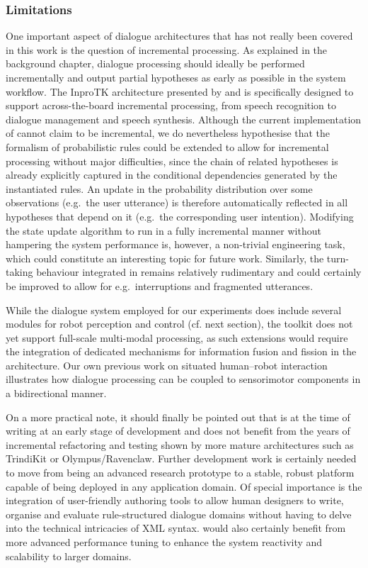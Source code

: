 \subsubsection*{Limitations}

One important aspect of dialogue architectures that has not really been covered in this work is the question of incremental processing.  As explained in the background chapter, dialogue processing should ideally be performed incrementally and output partial hypotheses as early as possible in the system workflow. The InproTK architecture presented by \cite{Baumann:2012} and \cite{baumann2013:phd} is specifically designed to support across-the-board incremental processing, from speech recognition to dialogue management and speech synthesis. Although the current implementation of \opendial{} cannot claim to be incremental, we do nevertheless hypothesise that the formalism of probabilistic rules could be extended to allow for incremental processing without major difficulties, since the chain of related hypotheses is already explicitly captured in the conditional dependencies generated by the instantiated rules.  An update in the probability distribution over some observations (e.g.\ the user utterance) is therefore automatically reflected in all hypotheses that depend on it (e.g.\ the corresponding user intention). Modifying the state update algorithm to run in a fully incremental manner without hampering the system performance is, however, a non-trivial engineering task, which could constitute an interesting topic for future work. Similarly, the turn-taking behaviour integrated in \opendial{} remains relatively rudimentary and could certainly be improved to allow for e.g.\ interruptions and fragmented utterances.

While the dialogue system employed for our experiments does include several modules for robot perception and control (cf. next section), the toolkit does not yet support full-scale multi-modal processing, as such extensions would require the integration of dedicated mechanisms for information fusion and fission in the architecture. Our own previous work on situated human--robot interaction \citep{cosybook:dialogue} illustrates how dialogue processing can be coupled to sensorimotor components in a bidirectional manner.  

On a more practical note, it should finally be pointed out that \opendial{} is at the time of writing at an early stage of development and does not benefit from the years of incremental refactoring and testing shown by more mature architectures such as TrindiKit or Olympus/Ravenclaw. Further development work is certainly needed to move \opendial{} from being an advanced research prototype to a stable, robust platform capable of being deployed in any application domain. Of special importance is the integration of user-friendly authoring tools to allow human designers to write, organise and evaluate rule-structured dialogue domains without having to delve into the technical intricacies of XML syntax. \opendial{} would also certainly benefit from more advanced performance tuning to enhance the system reactivity and scalability to larger domains. 


